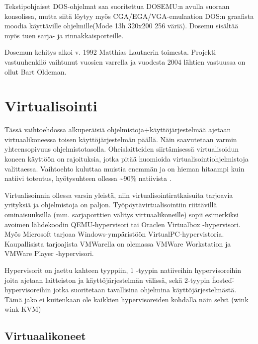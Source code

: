 Tekstipohjaiset DOS-ohjelmat saa suoritettua DOSEMU:n avulla suoraan konsolissa, mutta siitä löytyy myös CGA/EGA/VGA-emulaation DOS:n graafista moodia käyttäville ohjelmille(Mode 13h 320x200 256 väriä). Dosemu sisältää myös tuen sarja- ja rinnakkaisporteille.

Dosemun kehitys alkoi v. 1992 Matthias Lautnerin toimesta. Projekti vastuuhenkilö vaihtunut vuosien varrella ja vuodesta 2004 lähtien vastuussa on ollut Bart Oldeman.




\section{Virtualisointi}

Tässä vaihtoehdossa alkuperäisiä ohjelmistoja+käyttöjärjestelmää ajetaan virtuaalikoneessa toisen käyttöjärjestelmän päällä. Näin saavutetaan varmin yhteensopivuus ohjelmistotasolla. Oheislaitteiden siirtämisessä virtualisoidun koneen käyttöön on rajoituksia, jotka pitää huomioida virtualisointiohjelmistoja valittaessa. Vaihtoehto kuluttaa muistia enemmän ja on hieman hitaampi kuin natiivi toteutus, hyötysuhteen ollessa \textasciitilde{}90\%  natiivista \cite{virtnat_anadtech}.

Virtualisoinnin ollessa varsin yleistä, niin virtualisointiratkaisuita tarjoavia yrityksiä ja ohjelmistoja on paljon. Työpöytävirtualisointiin riittävillä ominaisuuksilla (mm. sarjaporttien välitys virtuaalikoneille) sopii esimerkiksi avoimen lähdekoodin QEMU-hypervisori tai Oraclen Virtualbox -hypervisori. Myös Microsoft tarjoaa Windows-ympäristöön VirtualPC-hypervistoria. Kaupallisista tarjoajista VMWarella on olemassa VMWare Workstation ja VMWare Player -hypervisori.

Hypervisorit on jaettu kahteen tyyppiin, 1 -tyypin natiiveihin hypervisoreihin joita ajetaan laitteiston ja käyttöjärjestelmän välissä, sekä 2-tyypin \"hosted\" -hypervisoreihin jotka suoritetaan tavallisina ohjelmina käyttöjärjestelmästä. Tämä jako ei kuitenkaan ole kaikkien hypervisoreiden kohdalla näin selvä (wink wink KVM)


\subsection{Virtuaalikoneet}
